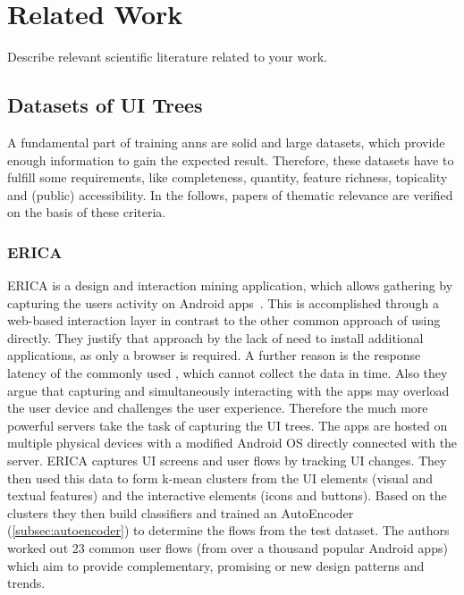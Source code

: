 \chapter{Related Work}
\label{ch:related-work}

Describe relevant scientific literature related to your work.


\section{Datasets of UI Trees}
\label{sec:datasets-of-ui-trees}

A fundamental part of training \gls{ann}s are solid and large datasets, which provide enough information to gain the expected result.
Therefore, these datasets have to fulfill some requirements, like completeness, quantity, feature richness, topicality and (public) accessibility.
In the follows, papers of thematic relevance are verified on the basis of these criteria.

\subsection{ERICA}
\label{subsec:erica}

ERICA is a design and interaction mining application, which allows gathering  by capturing the users activity on Android apps~\cite{deka2016erica}.
This is accomplished through a web-based interaction layer in contrast to the other common approach of using  directly.
They justify that approach by the lack of need to install additional applications, as only a browser is required.
A further reason is the response latency of the commonly used , which cannot collect the data in time.
Also they argue that capturing and simultaneously interacting with the apps may overload the user device and challenges the user experience.
Therefore the much more powerful servers take the task of capturing the UI trees.
The apps are hosted on multiple physical devices with a modified Android OS directly connected with the server.
ERICA captures UI screens and user flows by tracking UI changes.
They then used this data to form k-mean clusters from the UI elements (visual and textual features) and the interactive elements (icons and buttons).
Based on the clusters they then build classifiers and trained an AutoEncoder (\ref{subsec:autoencoder}) to determine the flows from the test dataset.
The authors worked out 23 common user flows (from over a thousand popular Android apps) which aim to provide complementary, promising or new design patterns and trends.

